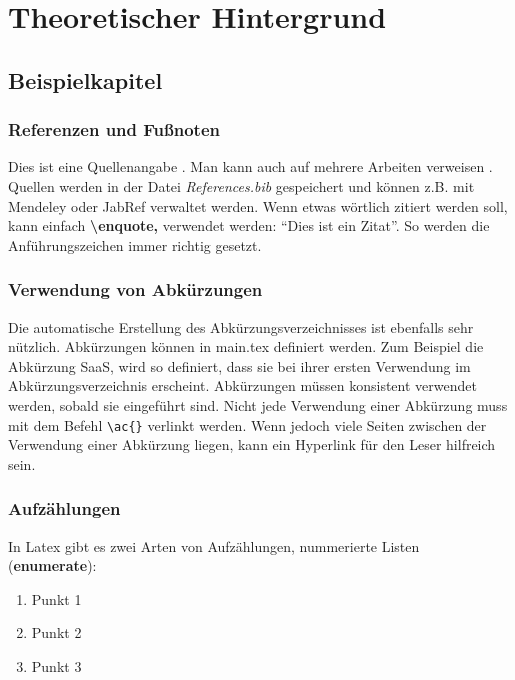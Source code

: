 
\chapter{Theoretischer Hintergrund}
\label{chap:background}

\section{Beispielkapitel}

\subsection{Referenzen und Fußnoten}

Dies ist eine Quellenangabe \citep{Pernul1994}. Man kann auch auf mehrere Arbeiten verweisen \citep{Pernul1994, pernul2009datenbanken}. Quellen werden in der Datei \textit{References.bib} gespeichert und können z.B. mit Mendeley oder JabRef verwaltet werden. Wenn etwas wörtlich zitiert werden soll, kann einfach
\textbf{\textbackslash enquote,} verwendet werden: \enquote{Dies ist ein Zitat}. So werden die Anführungszeichen immer richtig gesetzt. \par\smallskip


\subsection{Verwendung von Abkürzungen}

Die automatische Erstellung des Abkürzungsverzeichnisses ist ebenfalls sehr nützlich. Abkürzungen können in main.tex definiert werden. Zum Beispiel die Abkürzung \ac{SaaS}, wird so definiert, dass sie bei ihrer ersten Verwendung im Abkürzungsverzeichnis erscheint. Abkürzungen müssen konsistent verwendet werden, sobald sie eingeführt sind. Nicht jede Verwendung einer Abkürzung muss mit dem Befehl \verb+\ac{}+ verlinkt werden. Wenn jedoch viele Seiten zwischen der Verwendung einer Abkürzung liegen, kann ein Hyperlink für den Leser hilfreich sein.


\subsection{Aufzählungen}
In Latex gibt es zwei Arten von Aufzählungen, nummerierte Listen (\textbf{enumerate}):
\begin{enumerate}
    \item Punkt 1
    \item Punkt 2
    \item Punkt 3
\end{enumerate}

